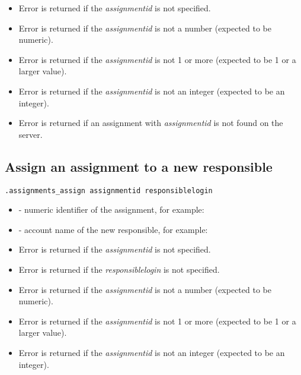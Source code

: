 \errheader
\begin{itemize}
    \item Error  is returned if the \textit{assignmentid} is not specified.
    \item Error  is returned if the \textit{assignmentid} is not a number (expected to be numeric).
    \item Error  is returned if the \textit{assignmentid} is not 1 or more (expected to be 1 or a larger value).
    \item Error  is returned if the \textit{assignmentid} is not an integer (expected to be an integer).
    \item Error  is returned if an assignment with \textit{assignmentid} is not found on the server.
\end{itemize}


\subsection{Assign an assignment to a new responsible}

\begin{lstlisting}[style=CommandLineStyle]
.assignments_assign assignmentid responsiblelogin
\end{lstlisting}

\paramsheader
\begin{itemize}

    \item {} - numeric identifier of the assignment, for
    example:

    \item {} - account name of the new responsible, for
    example:

\end{itemize}

\errheader
\begin{itemize}
    \item Error  is returned if the \textit{assignmentid} is not specified.
    \item Error  is returned if the \textit{responsiblelogin} is not specified.
    \item Error  is returned if the \textit{assignmentid} is not a number (expected to be numeric).
    \item Error  is returned if the \textit{assignmentid} is not 1 or more (expected to be 1 or a larger value).
    \item Error  is returned if the \textit{assignmentid} is not an integer (expected to be an integer).
\end{itemize}



